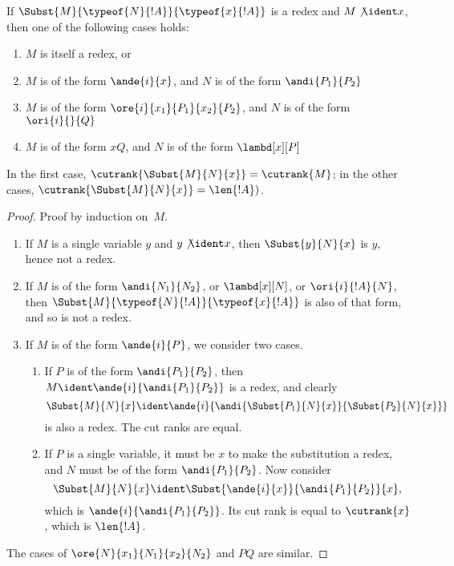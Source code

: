\documentclass[../../../include/open-logic-section]{subfiles}
\begin{document}
\begin{lem}
  If $\Subst{M}{\typeof{N}{!A}}{\typeof{x}{!A}}$ is a redex and $M
  \not\ident x$, then one of the following cases holds:
  \begin{enumerate}
  \item $M$ is itself a redex, or
  \item $M$ is of the form $\ande{i}{x}$, and $N$ is of the form
    $\andi{P_1}{P_2}$
  \item $M$ is of the form $\ore{i}{x_1}{P_1}{x_2}{P_2}$, and $N$ is
    of the form $\ori{i}{}{Q}$
  \item $M$ is of the form $x Q$, and $N$ is of the form
    $\lambd[x][P]$
  \end{enumerate}
  In the first case, $\cutrank{\Subst{M}{N}{x}} = \cutrank{M}$; in the
  other cases, $\cutrank{\Subst{M}{N}{x}} = \len{!A})$.
\end{lem}
\begin{proof}
  Proof by induction on~$M$.
  \begin{enumerate}
  \item If $M$ is a single variable $y$ and $y \not\ident x$, then
    $\Subst{y}{N}{x}$ is $y$, hence not a redex.
  \item If $M$ is of the form $\andi{N_1}{N_2}$, or $\lambd[x][N]$, or
    $\ori{i}{!A}{N}$, then $\Subst{M}{\typeof{N}{!A}}{\typeof{x}{!A}}$ is
    also of that form, and so is not a redex.
  \item If $M$ is of the form $\ande{i}{P}$, we consider two cases.
    \begin{enumerate}
      \item If $P$ is of the form $\andi{P_1}{P_2}$, then $M \ident
        \ande{i}{\andi{P_1}{P_2}}$ is a redex, and clearly
        \[
        \Subst{M}{N}{x} \ident
        \ande{i}{\andi{\Subst{P_1}{N}{x}}{\Subst{P_2}{N}{x}}}
        \]
        is also a redex. The cut ranks are equal.
      \item If $P$ is a single variable, it must be $x$ to make the
        substitution a redex, and $N$ must be of the form
        $\andi{P_1}{P_2}$. Now consider
        \[
        \Subst{M}{N}{x} \ident \Subst{\ande{i}{x}}{\andi{P_1}{P_2}}{x},
        \]
        which is $\ande{i}{\andi{P_1}{P_2}}$. Its cut rank is equal to
        $\cutrank{x}$, which is $\len{!A}$.
    \end{enumerate}
  \end{enumerate}
  The cases of $\ore{N}{x_1}{N_1}{x_2}{N_2}$ and $P Q$ are similar.
\end{proof}
\end{document}
